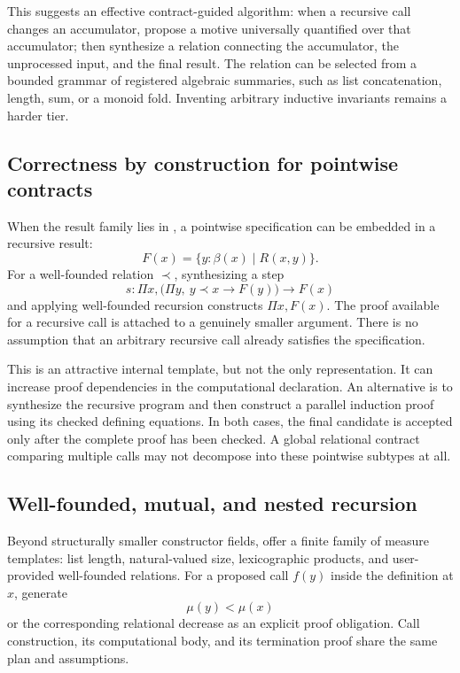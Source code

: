 \documentclass[11pt,a4paper]{article}
\newcommand{\code}[1]{\texttt{\detokenize{#1}}}
\theoremstyle{remark}
\begin{document}
This suggests an effective contract-guided algorithm: when a recursive call changes an accumulator, propose a motive universally quantified over that accumulator; then synthesize a relation connecting the accumulator, the unprocessed input, and the final result. The relation can be selected from a bounded grammar of registered algebraic summaries, such as list concatenation, length, sum, or a monoid fold. Inventing arbitrary inductive invariants remains a harder tier.

\subsection{Correctness by construction for pointwise contracts}

When the result family lies in \code{Type}, a pointwise specification can be embedded in a recursive result:
\[
 F(x)=\{y:\beta(x)\mid R(x,y)\}.
\]
For a well-founded relation $\prec$, synthesizing a step
\[
 s:\Pi x,\bigl(\Pi y,\ y\prec x\to F(y)\bigr)\to F(x)
\]
and applying well-founded recursion constructs $\Pi x,F(x)$. The proof available for a recursive call is attached to a genuinely smaller argument. There is no assumption that an arbitrary recursive call already satisfies the specification.

This is an attractive internal template, but not the only representation. It can increase proof dependencies in the computational declaration. An alternative is to synthesize the recursive program and then construct a parallel induction proof using its checked defining equations. In both cases, the final candidate is accepted only after the complete proof has been checked. A global relational contract comparing multiple calls may not decompose into these pointwise subtypes at all.

\subsection{Well-founded, mutual, and nested recursion}

Beyond structurally smaller constructor fields, offer a finite family of measure templates: list length, natural-valued size, lexicographic products, and user-provided well-founded relations. For a proposed call $f(y)$ inside the definition at $x$, generate
\[
 \mu(y)<\mu(x)
\]
or the corresponding relational decrease as an explicit proof obligation. Call construction, its computational body, and its termination proof share the same plan and assumptions.
\end{document}
